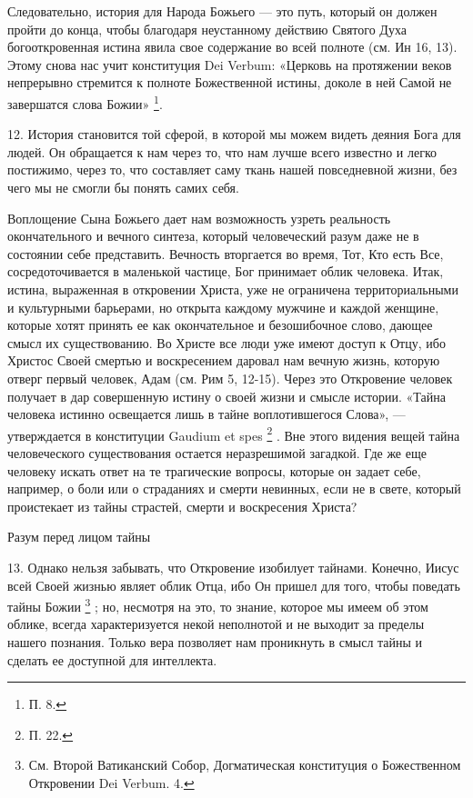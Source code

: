 \documentclass[a5paper,10pt]{article}
\begin{document}
Следовательно, история для Народа Божьего — это путь, который он должен пройти
до конца, чтобы благодаря неустанному действию Святого Духа богооткровенная
истина явила свое содержание во всей полноте (см. Ин 16, 13). Этому снова нас
учит конституция Dei Verbum: «Церковь на протяжении веков непрерывно стремится
к полноте Божественной истины, доколе в ней Самой не завершатся слова
Божии» \footnote{П. 8.}.

12. История становится той сферой, в которой мы можем видеть деяния Бога для
людей. Он обращается к нам через то, что нам лучше всего известно и легко
постижимо, через то, что составляет саму ткань нашей повседневной жизни, без
чего мы не смогли бы понять самих себя.

Воплощение Сына Божьего дает нам возможность узреть реальность окончательного и
вечного синтеза, который человеческий разум даже не в состоянии себе
представить. Вечность вторгается во время, Тот, Кто есть Все, сосредоточивается
в маленькой частице, Бог принимает облик человека. Итак, истина, выраженная в
откровении Христа, уже не ограничена территориальными и культурными барьерами,
но открыта каждому мужчине и каждой женщине, которые хотят принять ее как
окончательное и безошибочное слово, дающее смысл их существованию. Во Христе
все люди уже имеют доступ к Отцу, ибо Христос Своей смертью и воскресением
даровал нам вечную жизнь, которую отверг первый человек, Адам (см. Рим 5,
12-15). Через это Откровение человек получает в дар совершенную истину о своей
жизни и смысле истории. «Тайна человека истинно освещается лишь в тайне
воплотившегося Слова», — утверждается в конституции Gaudium et spes
\footnote{П. 22.} . Вне этого видения вещей тайна человеческого существования
остается неразрешимой загадкой. Где же еще человеку искать ответ на те
трагические вопросы, которые он задает себе, например, о боли или о страданиях
и смерти невинных, если не в свете, который проистекает из тайны страстей,
смерти и воскресения Христа?

Разум перед лицом тайны

13. Однако нельзя забывать, что Откровение изобилует тайнами. Конечно, Иисус
всей Своей жизнью являет облик Отца, ибо Он пришел для того, чтобы поведать
тайны Божии \footnote{См. Второй Ватиканский Собор, Догматическая конституция о
Божественном Откровении Dei Verbum. 4.} ; но, несмотря на это, то знание,
которое мы имеем об этом облике, всегда характеризуется некой неполнотой и не
выходит за пределы нашего познания. Только вера позволяет нам проникнуть в
смысл тайны и сделать ее доступной для интеллекта.
\end{document}
